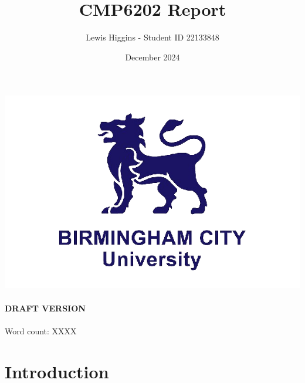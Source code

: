 \documentclass[12pt]{report}
\title{CMP6202 Report}
\author{Lewis Higgins - Student ID 22133848}
\date{December 2024}
\begin{document}
\makeatletter
\begin{titlepage}
    \begin{center}
        \includegraphics[width=0.7\linewidth]{BCU}\\[4ex]
        {\large \bfseries  \@title }\\[2ex]
        {\large \bfseries  DRAFT VERSION }\\[2ex]
        {\@author}\\[30ex]
        {Word count: XXXX}\\[20ex]
    \end{center}
\end{titlepage}
\makeatother
\thispagestyle{empty}
\newpage


\setcounter{page}{0}

\tableofcontents
\thispagestyle{empty}

\chapter*{Introduction}
\end{document}
